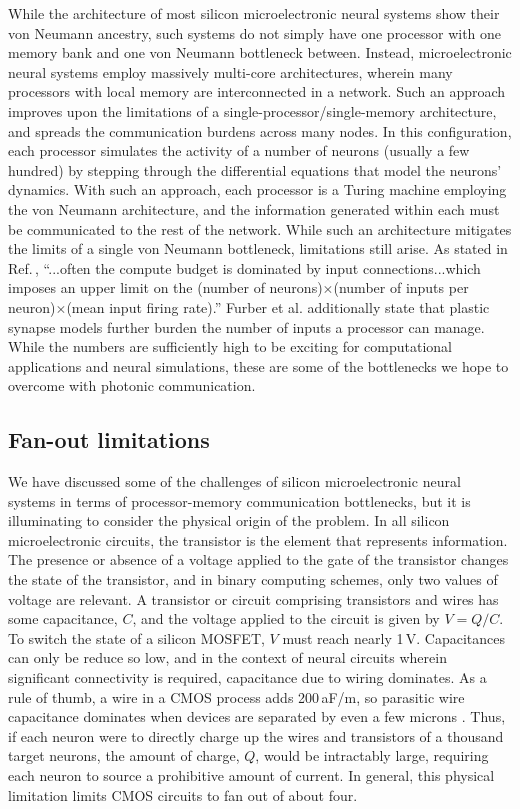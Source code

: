 \documentclass[twocolumn]{article}
\begin{document}
While the architecture of most silicon microelectronic neural systems show their von Neumann ancestry, such systems do not simply have one processor with one memory bank and one von Neumann bottleneck between. Instead, microelectronic neural systems employ massively multi-core architectures, wherein many processors with local memory are interconnected in a network. Such an approach improves upon the limitations of a single-processor/single-memory architecture, and spreads the communication burdens across many nodes. In this configuration, each processor simulates the activity of a number of neurons (usually a few hundred) by stepping through the differential equations that model the neurons' dynamics. With such an approach, each processor is a Turing machine employing the von Neumann architecture, and the information generated within each must be communicated to the rest of the network. While such an architecture mitigates the limits of a single von Neumann bottleneck, limitations still arise. As stated in Ref.\,\cite{fuga2014}, ``...often the compute budget is dominated by input connections...which imposes an upper limit on the (number of neurons)$\times$(number of inputs per neuron)$\times$(mean input firing rate).'' Furber et al. additionally state that plastic synapse models further burden the number of inputs a processor can manage. While the numbers are sufficiently high to be exciting for computational applications and neural simulations, these are some of the bottlenecks we hope to overcome with photonic communication. 

\subsection{Fan-out limitations}
We have discussed some of the challenges of silicon microelectronic neural systems in terms of processor-memory communication bottlenecks, but it is illuminating to consider the physical origin of the problem. In all silicon microelectronic circuits, the transistor is the element that represents information. The presence or absence of a voltage applied to the gate of the transistor changes the state of the transistor, and in binary computing schemes, only two values of voltage are relevant. A transistor or circuit comprising transistors and wires has some capacitance, $C$, and the voltage applied to the circuit is given by $V = Q/C$. To switch the state of a silicon MOSFET, $V$ must reach nearly 1\,V. Capacitances can only be reduce so low, and in the context of neural circuits wherein significant connectivity is required, capacitance due to wiring dominates. As a rule of thumb, a wire in a CMOS process adds 200\,aF/\textmu m, so parasitic wire capacitance dominates when devices are separated by even a few microns \cite{mi2017}. Thus, if each neuron were to directly charge up the wires and transistors of a thousand target neurons, the amount of charge, $Q$, would be intractably large, requiring each neuron to source a prohibitive amount of current. In general, this physical limitation limits CMOS circuits to fan out of about four. 
\end{document}

